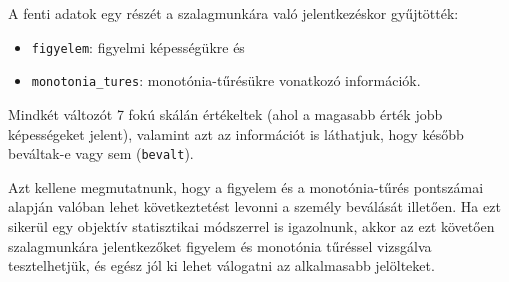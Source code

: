 \documentclass[
  letterpaper,
]{krantz}
\makeatletter
\newenvironment{Shaded}{\begin{snugshade}}{\end{snugshade}}
\newcommand{\AttributeTok}[1]{\textcolor[rgb]{0.40,0.45,0.13}{#1}}
\newcommand{\CommentTok}[1]{\textcolor[rgb]{0.37,0.37,0.37}{#1}}
\newcommand{\FunctionTok}[1]{\textcolor[rgb]{0.28,0.35,0.67}{#1}}
\newcommand{\NormalTok}[1]{\textcolor[rgb]{0.00,0.23,0.31}{#1}}
\newcommand{\OtherTok}[1]{\textcolor[rgb]{0.00,0.23,0.31}{#1}}
\newcommand{\SpecialCharTok}[1]{\textcolor[rgb]{0.37,0.37,0.37}{#1}}
\newcommand{\StringTok}[1]{\textcolor[rgb]{0.13,0.47,0.30}{#1}}
\providecommand{\tightlist}{%
  \setlength{\itemsep}{0pt}\setlength{\parskip}{0pt}}\usepackage{longtable,booktabs,array}
\newenvironment{kframe}{%
\medskip{}
\setlength{\fboxsep}{.8em}
 \def\at@end@of@kframe{}%
 \ifinner\ifhmode%
  \def\at@end@of@kframe{\end{minipage}}%
  \begin{minipage}{\columnwidth}%
 \fi\fi%
 \def\FrameCommand##1{\hskip\@totalleftmargin \hskip-\fboxsep
 \colorbox{shadecolor}{##1}\hskip-\fboxsep
     \hskip-\linewidth \hskip-\@totalleftmargin \hskip\columnwidth}%
 \MakeFramed {\advance\hsize-\width
   \@totalleftmargin\z@ \linewidth\hsize
   \@setminipage}}%
 {\par\unskip\endMakeFramed%
 \at@end@of@kframe}
\renewenvironment{Shaded}{\begin{kframe}}{\end{kframe}}
\makeatother
\begin{document}
\begin{Shaded}
\end{Shaded}

A fenti adatok egy részét a szalagmunkára való jelentkezéskor
gyűjtötték:

\begin{itemize}
\tightlist
\item
  \texttt{figyelem}: figyelmi képességükre és
\item
  \texttt{monotonia\_tures}: monotónia-tűrésükre vonatkozó információk.
\end{itemize}

Mindkét változót 7 fokú skálán értékeltek (ahol a magasabb érték jobb
képességeket jelent), valamint azt az információt is láthatjuk, hogy
később beváltak-e vagy sem (\texttt{bevalt}).

Azt kellene megmutatnunk, hogy a figyelem és a monotónia-tűrés
pontszámai alapján valóban lehet következtetést levonni a személy
beválását illetően. Ha ezt sikerül egy objektív statisztikai módszerrel
is igazolnunk, akkor az ezt követően szalagmunkára jelentkezőket
figyelem és monotónia tűréssel vizsgálva tesztelhetjük, és egész jól ki
lehet válogatni az alkalmasabb jelölteket.
\end{document}
